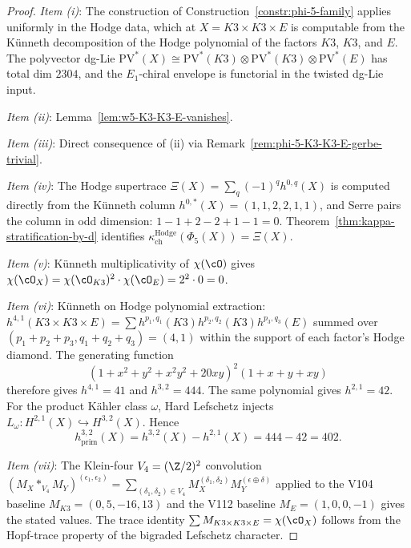\begin{proof}
\textit{Item (i)}: The construction of
Construction~\ref{constr:phi-5-family} applies uniformly in the Hodge data,
which at $X = K3 \times K3 \times E$ is computable from the K\"unneth
decomposition of the Hodge polynomial of the factors $K3$, $K3$, and $E$.
The polyvector dg-Lie $\mathrm{PV}^*(X) \cong \mathrm{PV}^*(K3) \otimes
\mathrm{PV}^*(K3) \otimes \mathrm{PV}^*(E)$ has total dim $2304$, and the
$E_1$-chiral envelope is functorial in the twisted dg-Lie input.

\textit{Item (ii)}: Lemma~\ref{lem:w5-K3-K3-E-vanishes}.

\textit{Item (iii)}: Direct consequence of (ii) via
Remark~\ref{rem:phi-5-K3-K3-E-gerbe-trivial}.

\textit{Item (iv)}: The Hodge supertrace
$\Xi(X) = \sum_q (-1)^q h^{0,q}(X)$ is computed directly from the
K\"unneth column
$h^{0,*}(X) = (1, 1, 2, 2, 1, 1)$, and Serre pairs the column in odd
dimension: $1 - 1 + 2 - 2 + 1 - 1 = 0$.
Theorem~\ref{thm:kappa-stratification-by-d} identifies
$\kappa_{\mathrm{ch}}^{\mathrm{Hodge}}(\Phi_5(X)) = \Xi(X)$.

\textit{Item (v)}: K\"unneth multiplicativity of $\chi(\cO)$ gives
$\chi(\cO_X) = \chi(\cO_{K3})^2 \cdot \chi(\cO_E) = 2^2 \cdot 0 = 0$.

\textit{Item (vi)}: K\"unneth on Hodge polynomial extraction:
$h^{4,1}(K3 \times K3 \times E) = \sum h^{p_1, q_1}(K3) h^{p_2, q_2}(K3)
h^{p_3, q_3}(E)$ summed over $(p_1+p_2+p_3, q_1+q_2+q_3) = (4, 1)$ within
the support of each factor's Hodge diamond. The generating function
\[
 (1+x^2+y^2+x^2y^2+20xy)^2(1+x+y+xy)
\]
therefore gives \(h^{4,1}=41\) and \(h^{3,2}=444\). The same polynomial gives
\(h^{2,1}=42\). For the product K\"ahler class \(\omega\), Hard Lefschetz
injects \(L_\omega\colon H^{2,1}(X)\hookrightarrow H^{3,2}(X)\). Hence
\[
h^{3,2}_{\mathrm{prim}}(X)=h^{3,2}(X)-h^{2,1}(X)=444-42=402.
\]

\textit{Item (vii)}: The Klein-four $V_4 = (\Z/2)^2$ convolution
$(M_X *_{V_4} M_Y)^{(\epsilon_1, \epsilon_2)} = \sum_{(\delta_1, \delta_2)
\in V_4} M_X^{(\delta_1, \delta_2)} M_Y^{(\epsilon \oplus \delta)}$ applied
to the V104 baseline $M_{K3} = (0, 5, -16, 13)$ and the V112 baseline
$M_E = (1, 0, 0, -1)$ gives the stated values. The trace identity
$\sum M_{K3 \times K3 \times E} = \chi(\cO_X)$ follows from the Hopf-trace
property of the bigraded Lefschetz character.
\end{proof}

